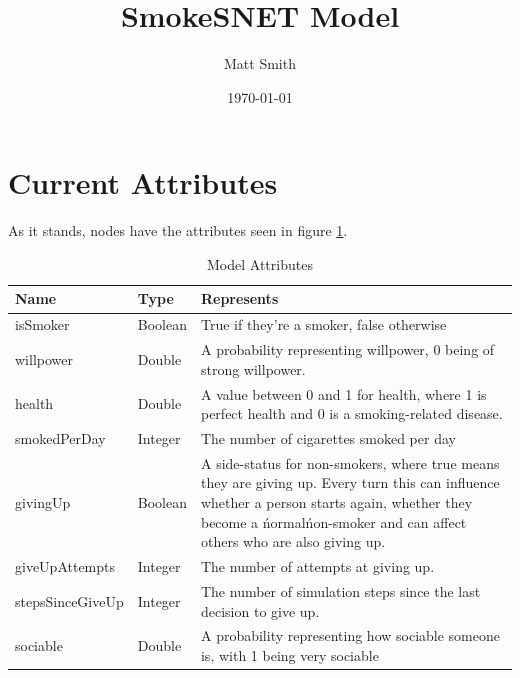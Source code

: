 \documentclass[]{article}
\begin{document}
\title{SmokeSNET Model}
\author{Matt Smith}
\date{\today}
\maketitle

\section{Current Attributes}
As it stands, nodes have the attributes seen in figure \ref{attr}.

\begin{table}
    \begin{tabular}{|l|l|p{12cm}|}
        \hline
        Name & Type & Represents \\ \hline
        	isSmoker &  Boolean & True if they're a smoker, false otherwise \\ 
 	willpower &  Double & A probability representing willpower, 0 being of strong willpower. \\ 
	health &  Double & A value between 0 and 1 for health, where 1 is perfect health and 0 is a smoking-related disease.\\ 
	smokedPerDay &  Integer & The number of cigarettes smoked per day\\ 
	givingUp & Boolean & A side-status for non-smokers, where true means they are giving up. Every turn this can influence whether a person starts again, whether they become a \'normal\' non-smoker and can affect others who are also giving up. \\ 
 	giveUpAttempts & Integer & The number of attempts at giving up. \\ 
 	stepsSinceGiveUp &  Integer & The number of simulation steps since the last decision to give up. \\ 
	sociable &  Double & A probability representing how sociable someone is, with 1 being very sociable \\ 
        \hline
    \end{tabular}
\label{attr}
\caption{Model Attributes}
\end{table}
\end{document}
